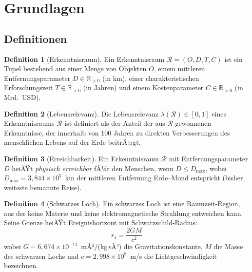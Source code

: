 ﻿\documentclass[a4paper,12pt]{article}
\theoremstyle{definition}
\newtheorem{definition}{Definition}
\begin{document}
\section{Grundlagen}

\subsection{Definitionen}

\begin{definition}[Erkenntnisraum]
    Ein Erkenntnisraum $\mathcal{R} = (O, D, T, C)$ ist ein Tupel bestehend
    aus einer Menge von Objekten $O$, einem mittleren Entfernungsparameter
    $D \in \mathbb{R}_{>0}$ (in km), einer charakteristischen Erforschungszeit
    $T \in \mathbb{R}_{>0}$ (in Jahren) und einem Kostenparameter
    $C \in \mathbb{R}_{>0}$ (in Mrd.~USD).
\end{definition}

\begin{definition}[Lebensrelevanz]
    Die Lebensrelevanz $\lambda(\mathcal{R}) \in [0,1]$ eines Erkenntnisraums
    $\mathcal{R}$ ist definiert als der Anteil der aus $\mathcal{R}$ gewonnenen
    Erkenntnisse, der innerhalb von 100 Jahren zu direkten Verbesserungen des
    menschlichen Lebens auf der Erde beitrÃ¤gt.
\end{definition}

\begin{definition}[Erreichbarkeit]
    Ein Erkenntnisraum $\mathcal{R}$ mit Entfernungsparameter $D$ heiÃŸt
    \emph{physisch erreichbar} fÃ¼r den Menschen, wenn $D \leq D_{\max}$,
    wobei $D_{\max} = 3{,}844 \times 10^5$~km der mittleren Entfernung
    Erde--Mond entspricht (bisher weiteste bemannte Reise).
\end{definition}

\begin{definition}[Schwarzes Loch]
    Ein schwarzes Loch ist eine Raumzeit-Region, aus der keine Materie und
    keine elektromagnetische Strahlung entweichen kann. Seine Grenze heiÃŸt
    Ereignishorizont mit Schwarzschild-Radius:
    \[
        r_s = \frac{2GM}{c^2}
    \]
    wobei $G = 6{,}674 \times 10^{-11}$~mÂ³/(kg\,sÂ²) die Gravitationskonstante,
    $M$ die Masse des schwarzen Lochs und $c = 2{,}998 \times 10^8$~m/s die
    Lichtgeschwindigkeit bezeichnen.
\end{definition}
\end{document}
